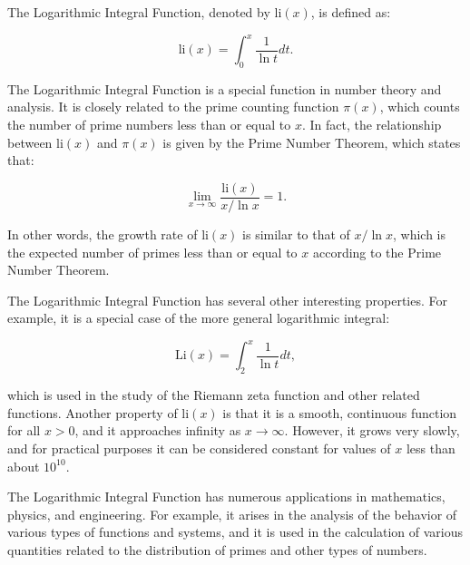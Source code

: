 \documentclass{article}
\begin{document}
The Logarithmic Integral Function, denoted by $\text{li}(x)$, is defined as:

\begin{equation*}
\text{li}(x) = \int_{0}^{x} \frac{1}{\ln t} dt.
\end{equation*}

The Logarithmic Integral Function is a special function in number theory and analysis. It is closely related to the prime counting function $\pi(x)$, which counts the number of prime numbers less than or equal to $x$. In fact, the relationship between $\text{li}(x)$ and $\pi(x)$ is given by the Prime Number Theorem, which states that:

\begin{equation*}
\lim_{x \rightarrow \infty} \frac{\text{li}(x)}{x/\ln x} = 1.
\end{equation*}

In other words, the growth rate of $\text{li}(x)$ is similar to that of $x/\ln x$, which is the expected number of primes less than or equal to $x$ according to the Prime Number Theorem.

The Logarithmic Integral Function has several other interesting properties. For example, it is a special case of the more general logarithmic integral:

\begin{equation*}
\text{Li}(x) = \int_{2}^{x} \frac{1}{\ln t} dt,
\end{equation*}

which is used in the study of the Riemann zeta function and other related functions. Another property of $\text{li}(x)$ is that it is a smooth, continuous function for all $x > 0$, and it approaches infinity as $x \rightarrow \infty$. However, it grows very slowly, and for practical purposes it can be considered constant for values of $x$ less than about $10^{10}$.

The Logarithmic Integral Function has numerous applications in mathematics, physics, and engineering. For example, it arises in the analysis of the behavior of various types of functions and systems, and it is used in the calculation of various quantities related to the distribution of primes and other types of numbers.
\end{document}
